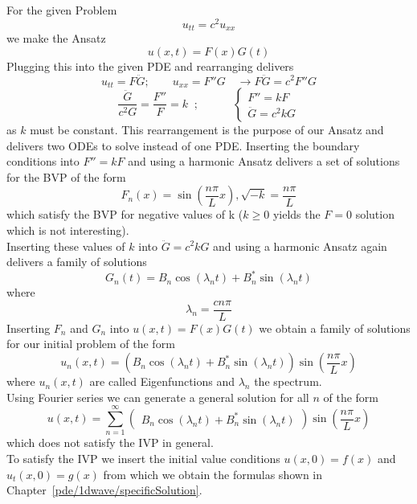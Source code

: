 \begin{examplesection}
    For the given Problem
    \[ u_{tt}=c^2u_{xx}\]
    we make the Ansatz
    \[u(x,t)=F(x)G(t)\]
    Plugging this into the given PDE and rearranging delivers
    \[u_{tt}=F\ddot{G};\qquad u_{xx}=F''G \quad \rightarrow F\ddot{G}=c^2F''G\]
    \[\frac{\ddot{G}}{c^2G}=\frac{F''}{F}=k\;\; ;\qquad\quad\begin{cases} F''=kF \\
            \ddot{G}=c^2kG
        \end{cases}\]
    as $k$ must be constant. This rearrangement is the purpose of our Ansatz and delivers two ODEs to solve instead of one PDE.
    Inserting the boundary conditions into $F''=kF$ and using a harmonic Ansatz delivers a set of solutions for the BVP of the form
    \[F_n (x)=\sin{\left( \frac{n \pi}{L} x \right) }, \sqrt{-k}=\frac{n \pi}{L}\]
    which satisfy the BVP for negative values of k ($k \ge 0$ yields the $F=0$ solution which is not interesting).\\
    Inserting these values of $k$ into $\ddot{G}=c^2kG$ and using a harmonic Ansatz again delivers a family of solutions
    \[G_n (t) =  B_n \cos{(\lambda_{n} t)} + B_n^* \sin{(\lambda_{n}t)}\]
    where
    \[ \lambda_{n} = \frac{c n \pi}{L} \]
    Inserting $F_n$ and $G_n$ into $u(x,t)=F(x)G(t)$ we obtain a family of solutions for our initial problem of the form
    \[u_n (x, t) = (B_n \cos{(\lambda_{n} t)} + B_n^* \sin{(\lambda_{n}t)})\sin{\left( \frac{n \pi}{L} x \right) } \]
    where $u_n (x, t)$ are called Eigenfunctions and $\lambda_n$ the spectrum.\\
    Using Fourier series we can generate a general solution for all $n$ of the form
    \[u(x,t)=\sum\limits_{n=1}^{\infty}\begin{pmatrix}
            B_n \cos(\lambda _n t)+B_n^* \sin(\lambda_n t)
        \end{pmatrix} \sin\left(\frac{n \pi}{L}x \right) \]
    which does not satisfy the IVP in general.\\
    To satisfy the IVP we insert the initial value conditions $u(x,0)=f(x)$ and $u_t(x,0)=g(x)$ from which we obtain the formulas shown in Chapter~\ref{pde/1dwave/specificSolution}.
\end{examplesection}


